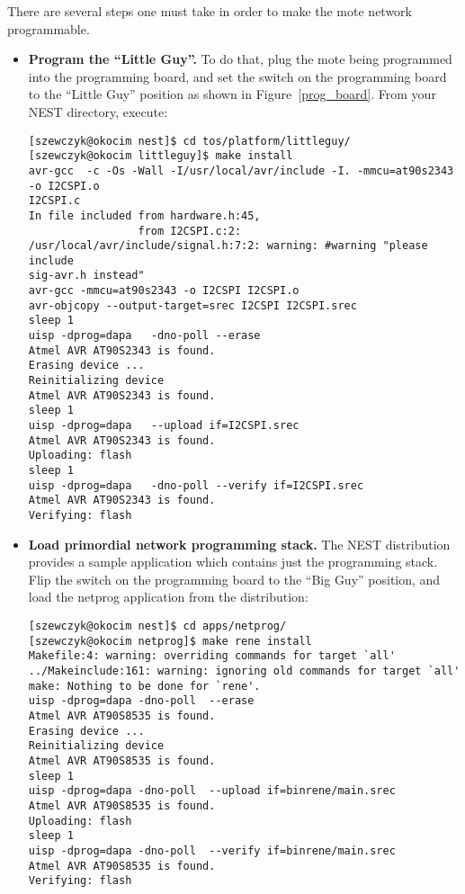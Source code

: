 \documentclass[12pt,fullpage]{article}
\newcommand{\nest} {NEST\xspace}
\begin{document}
There are several steps one must take in order to make the mote network
programmable. 
\begin{itemize}
\item{\bf Program the ``Little Guy''.} To do that, plug the mote being
programmed into the programming board, and set the switch on the programming
board to the ``Little Guy'' position as shown in
Figure~\ref{prog_board}.  From your \nest directory, execute:
\begin{small}
\begin{verbatim}
[szewczyk@okocim nest]$ cd tos/platform/littleguy/
[szewczyk@okocim littleguy]$ make install
avr-gcc  -c -Os -Wall -I/usr/local/avr/include -I. -mmcu=at90s2343 -o I2CSPI.o
I2CSPI.c
In file included from hardware.h:45,
                 from I2CSPI.c:2:
/usr/local/avr/include/signal.h:7:2: warning: #warning "please include
sig-avr.h instead"
avr-gcc -mmcu=at90s2343 -o I2CSPI I2CSPI.o
avr-objcopy --output-target=srec I2CSPI I2CSPI.srec
sleep 1
uisp -dprog=dapa   -dno-poll --erase
Atmel AVR AT90S2343 is found.
Erasing device ...
Reinitializing device
Atmel AVR AT90S2343 is found.
sleep 1
uisp -dprog=dapa   --upload if=I2CSPI.srec
Atmel AVR AT90S2343 is found.
Uploading: flash
sleep 1
uisp -dprog=dapa   -dno-poll --verify if=I2CSPI.srec
Atmel AVR AT90S2343 is found.
Verifying: flash
\end{verbatim}
\end{small}
\item{\bf Load primordial network programming stack.} The \nest distribution
provides a sample application which contains just the programming
stack. Flip the switch on the programming board to the ``Big Guy'' position,
and load the netprog application from the distribution:
\begin{small}
\begin{verbatim}
[szewczyk@okocim nest]$ cd apps/netprog/
[szewczyk@okocim netprog]$ make rene install
Makefile:4: warning: overriding commands for target `all'
../Makeinclude:161: warning: ignoring old commands for target `all'
make: Nothing to be done for `rene'.
uisp -dprog=dapa -dno-poll  --erase
Atmel AVR AT90S8535 is found.
Erasing device ...
Reinitializing device
Atmel AVR AT90S8535 is found.
sleep 1
uisp -dprog=dapa -dno-poll  --upload if=binrene/main.srec
Atmel AVR AT90S8535 is found.
Uploading: flash
sleep 1
uisp -dprog=dapa -dno-poll  --verify if=binrene/main.srec
Atmel AVR AT90S8535 is found.
Verifying: flash
\end{verbatim}
\end{small}


\end{itemize}
\end{document}
